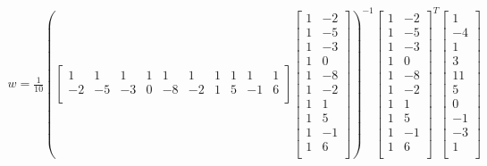 \documentclass[12pt]{article}
\begin{document}
\begin{enumerate}
\begin{enumerate}
\begin{equation}
	\begin{split}
		w = \frac{1}{10} (\begin{bmatrix}
			1 & 1 & 1 & 1 & 1 & 1 & 1 & 1 & 1 & 1\\
			-2 & -5 & -3 & 0 & -8 & -2 & 1 & 5 & -1 & 6\\
		\end{bmatrix}\begin{bmatrix}
			1 & -2\\
			1 & -5\\	
			1 & -3\\
			1 & 0\\
			1 & -8\\
			1 & -2\\
			1 & 1\\
			1 & 5\\
			1 & -1\\
			1 & 6\\
		\end{bmatrix})^{-1}\begin{bmatrix}
		1 & -2\\
		1 & -5\\	
		1 & -3\\
		1 & 0\\
		1 & -8\\
		1 & -2\\
		1 & 1\\
		1 & 5\\
		1 & -1\\
		1 & 6\\
	\end{bmatrix}^{T}\begin{bmatrix}
			1\\
			-4\\	
			1\\
			3\\
			11\\
			5\\
			0\\
			-1\\
			-3\\
			1\\
		\end{bmatrix}
	\end{split}
\end{equation}


\end{enumerate}
\end{enumerate}
\end{document}
